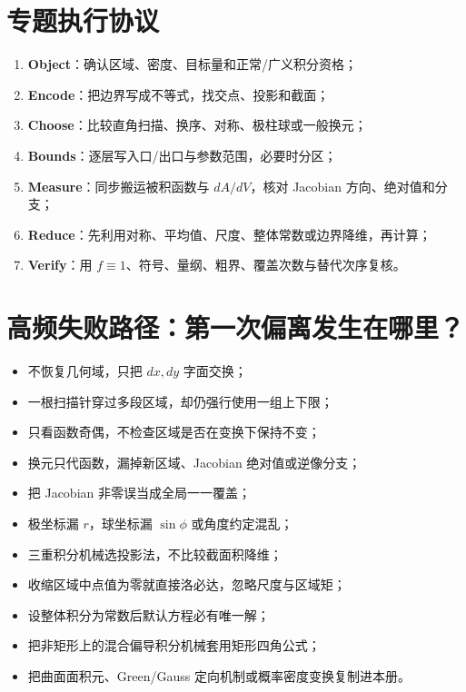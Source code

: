 \documentclass[11pt,a4paper,fontset=fandol]{ctexart}
\newcommand{\kw}[1]{\textbf{\color{deep}#1}}
\begin{document}
\section{专题执行协议}
\begin{enumerate}
  \item \kw{Object}：确认区域、密度、目标量和正常/广义积分资格；
  \item \kw{Encode}：把边界写成不等式，找交点、投影和截面；
  \item \kw{Choose}：比较直角扫描、换序、对称、极柱球或一般换元；
  \item \kw{Bounds}：逐层写入口/出口与参数范围，必要时分区；
  \item \kw{Measure}：同步搬运被积函数与 $dA/dV$，核对 Jacobian 方向、绝对值和分支；
  \item \kw{Reduce}：先利用对称、平均值、尺度、整体常数或边界降维，再计算；
  \item \kw{Verify}：用 $f\equiv1$、符号、量纲、粗界、覆盖次数与替代次序复核。
\end{enumerate}

\section{高频失败路径：第一次偏离发生在哪里？}
\begin{itemize}
  \item 不恢复几何域，只把 $dx,dy$ 字面交换；
  \item 一根扫描针穿过多段区域，却仍强行使用一组上下限；
  \item 只看函数奇偶，不检查区域是否在变换下保持不变；
  \item 换元只代函数，漏掉新区域、Jacobian 绝对值或逆像分支；
  \item 把 Jacobian 非零误当成全局一一覆盖；
  \item 极坐标漏 $r$，球坐标漏 $\sin\phi$ 或角度约定混乱；
  \item 三重积分机械选投影法，不比较截面积降维；
  \item 收缩区域中点值为零就直接洛必达，忽略尺度与区域矩；
  \item 设整体积分为常数后默认方程必有唯一解；
  \item 把非矩形上的混合偏导积分机械套用矩形四角公式；
  \item 把曲面面积元、Green/Gauss 定向机制或概率密度变换复制进本册。
\end{itemize}
\end{document}
